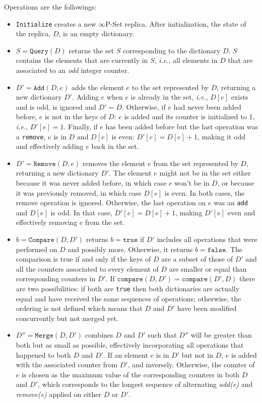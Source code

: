 \documentclass[10pt, oneside]{article}   	%
\begin{document}
Operations are the followings:
\begin{itemize}

	\item \texttt{Initialize} creates a new $\infty$P-Set replica. After initialization, the state of the replica, $D$, is an empty dictionary. 

	\item $S=\texttt{Query}(D)$ returns the set $S$ corresponding to the dictionary $D$. $S$ contains the elements that are currently in $S$, \textit{i.e.}, all elements in $D$ that are associated to an \textit{odd} integer counter.

	\item $D'=\texttt{Add}(D,e)$ adds the element $e$ to the set represented by $D$, returning a new dictionary $D'$.  Adding $e$ when $e$ is already in the set, \textit{i.e.}, $D[e]$ exists and is odd, is ignored and $D'=D$. Otherwise, if $e$ had never been added before, $e$ is not in the keys of $D$: $e$ is added and its counter is initialized to 1, \textit{i.e.}, $D'[e] = 1$. Finally, if $e$ has been added before but the last operation was a \texttt{remove}, $e$ is in $D$ and $D[e]$ is even: $D'[e] = D[e] + 1$, making it odd and effectively adding $e$ back in the set.

\item $D'=\texttt{Remove}(D, e)$ removes the element $e$ from the set represented by $D$, returning a new dictionary $D'$. The element $e$ might not be in the set either because it was never added before, in which case $e$ won't be in $D$, or because it was previously removed, in which case $D[e]$ is even. In both cases, the remove operation is ignored. Otherwise, the last operation on $e$ was an \texttt{add} and $D[e]$ is odd. In that case, $D'[e]=D[e]+1$, making $D'[e]$ even and effectively removing $e$ from the set.

\item $b=\texttt{Compare}(D, D')$ returns $b=\texttt{true}$ if $D'$ includes all operations that were performed on $D$ and possibly more. Otherwise, it returns $b=\texttt{false}$. The comparison is true if and only if the keys of $D$ are a subset of those of $D'$ and all the counters associated to every element of $D$ are smaller or equal than corresponding counters in $D'$. If $\texttt{compare}(D,D')= \texttt{compare}(D',D)$ there are two possibilities: if both are \texttt{true} then both dictionaries are actually equal and have received the same sequences of operations; otherwise, the ordering is not defined which means that $D$ and $D'$ have been modified concurrently but not merged yet.

\item $D''=\texttt{Merge}(D, D')$ combines $D$ and $D'$ such that $D''$ will be greater than both but as small as possible, effectively incorporating all operations that happened to both $D$ and $D'$. If an element $e$ is  in $D'$ but not in $D$, $e$ is added with the associated counter from $D'$, and inversely. Otherwise, the counter of $e$ is chosen as the maximum value of the corresponding counters in both $D$ and $D'$, which corresponds to the longest sequence of alternating \textit{add(e)} and \textit{remove(e)} applied on either $D$ or $D'$.
\end{itemize}
\end{document}

